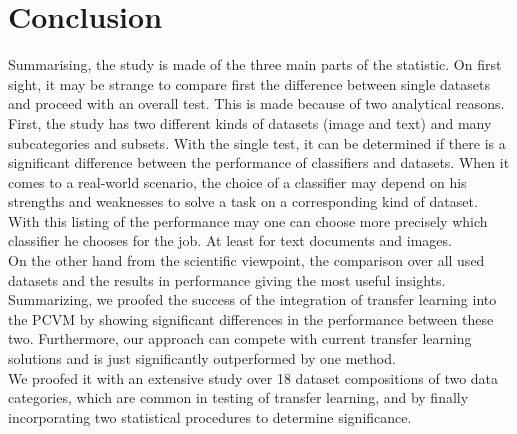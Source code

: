 \begin{table}[]
	\centering
	\caption[Result of Friedman Test with Bonferroni-Dun as Post-Hoc Test]{The result of the Friedman Test with Bonferroni-Dunn as Post-Hoc Test to compare classifiers over multiple Datasets.	\label{TableFriedman}}
\end{table}
\FloatBarrier
\section{Conclusion}\label{EmSecConc}
Summarising, the study is made of the three main parts of the statistic. On first sight, it may be strange to compare first the difference between single datasets and proceed with an overall test. This is made because of two analytical reasons. First, the study has two different kinds of datasets (image and text) and many subcategories and subsets. With the single test, it can be determined if there is a significant difference between the performance of classifiers and datasets. When it comes to a real-world scenario, the choice of a classifier may depend on his strengths and weaknesses to solve a task on a corresponding kind of dataset. With this listing of the performance may one can choose more precisely which classifier he chooses for the job. At least for text documents and images.\\
On the other hand from the scientific viewpoint, the comparison over all used datasets and the results in performance giving the most useful insights.\\
Summarizing, we proofed the success of the integration of transfer learning into the \acs{PCVM} by showing significant differences in the performance between these two. Furthermore, our approach can compete with current transfer learning solutions and is just significantly outperformed by one method.\\
We proofed it with an extensive study over 18 dataset compositions of two data categories, which are common in testing of transfer learning, and by finally incorporating two statistical procedures to determine significance.
